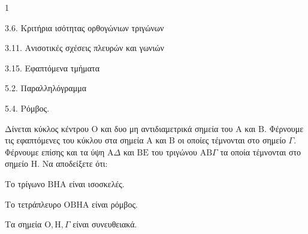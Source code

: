 \begin{ylh}{1}
    \item 3.6. Κριτήρια ισότητας ορθογώνιων τριγώνων
    \item 3.11. Ανισοτικές σχέσεις πλευρών και γωνιών
    \item 3.15. Εφαπτόμενα τμήματα
    \item 5.2. Παραλληλόγραμμα
    \item 5.4. Ρόμβος.
\end{ylh}
Δίνεται κύκλος κέντρου $\mathrm{O}$ και δυο μη αντιδιαμετρικά σημεία του $\mathrm{A}$ και $\mathrm{B}$. Φέρνουμε τις εφαπτόμενες του κύκλου στα σημεία $\mathrm{A}$ και $\mathrm{B}$ οι οποίες τέμνονται στο σημείο $\Gamma$. Φέρνουμε επίσης και τα ύψη $\mathrm{A}\Delta$ και $\mathrm{B}\mathrm{E}$ του τριγώνου $\mathrm{A}\mathrm{B}\Gamma$ τα οποία τέμνονται στο σημείο $\mathrm{H}$.
Να αποδείξετε ότι:
\begin{alist}
    \item Το τρίγωνο $\mathrm{B}\mathrm{H}\mathrm{A}$ είναι ισοσκελές. 
    \item Το τετράπλευρο $\mathrm{O}\mathrm{B}\mathrm{H}\mathrm{A}$ είναι ρόμβος. 
    \item Τα σημεία $\mathrm{O}, \mathrm{H}, \Gamma$ είναι συνευθειακά. 
\end{alist}
